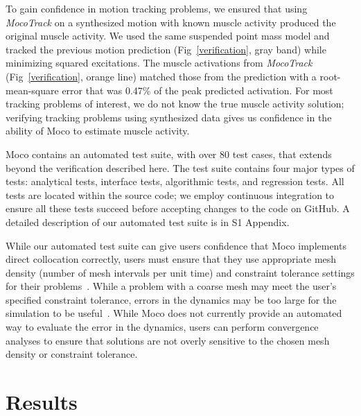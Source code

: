 \documentclass[10pt,letterpaper]{article}
\begin{document}
To gain confidence in motion tracking problems, we ensured that using \textit{MocoTrack} on a synthesized motion with known muscle activity produced the original muscle activity. We used the same suspended point mass model and tracked the previous motion prediction (Fig~\ref{verification}, gray band) while minimizing squared excitations. The muscle activations from \textit{MocoTrack} (Fig~\ref{verification}, orange line) matched those from the prediction with a root-mean-square error that was 0.47\% of the peak predicted activation. For most tracking problems of interest, we do not know the true muscle activity solution; verifying tracking problems using synthesized data gives us confidence in the ability of Moco to estimate muscle activity.

Moco contains an automated test suite, with over 80 test cases, that extends beyond the verification described here. The test suite contains four major types of tests: analytical tests, interface tests, algorithmic tests, and regression tests. All tests are located within the source code; we employ continuous integration to ensure all these tests succeed before accepting changes to the code on GitHub. A detailed description of our automated test suite is in S1 Appendix.

While our automated test suite can give users confidence that Moco implements direct collocation correctly, users must ensure that they use appropriate mesh density (number of mesh intervals per unit time) and constraint tolerance settings for their problems~\cite{Hicks:2015bo}. While a problem with a coarse mesh may meet the user's specified constraint tolerance, errors in the dynamics may be too large for the simulation to be useful~\cite{Betts:2010}. While Moco does not currently provide an automated way to evaluate the error in the dynamics, users can perform convergence analyses to ensure that solutions are not overly sensitive to the chosen mesh density or constraint tolerance.

\section*{Results}
\end{document}
